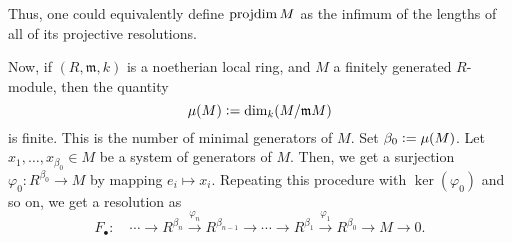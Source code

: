 \documentclass[12pt]{article}
\begin{document}
Thus, one could equivalently define $\operatorname{projdim} M$ as the infimum of the lengths of all of its projective resolutions.

Now, if $(R, \mathfrak{m}, k)$ is a noetherian local ring, and $M$ a finitely generated $R$-module, then the quantity
\begin{equation*} 
	\mu(M) \vcentcolon= \dim_{k}(M/\mathfrak{m} M)
\end{equation*}
is finite. This is the number of minimal generators of $M$. Set $\beta_{0} \vcentcolon= \mu(M)$. Let $x_{1}, \ldots, x_{\beta_{0}} \in M$ be a system of generators of $M$. Then, we get a surjection $\varphi_{0} : R^{\beta_{0}} \to M$ by mapping $e_{i} \mapsto x_{i}$. Repeating this procedure with $\ker(\varphi_{0})$ and so on, we get a resolution as
\begin{equation*} 
	F_{\bullet} : \quad \cdots \to R^{\beta_{n}} \xrightarrow{\varphi_{n}} R^{\beta_{n - 1}} \to \cdots \to R^{\beta_{1}} \xrightarrow{\varphi_{1}} R^{\beta_{0}} \to M \to 0.
\end{equation*}
\end{document}

